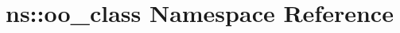 \hypertarget{namespacens_1_1oo__class}{}\section{ns\+::oo\+\_\+class Namespace Reference}
\label{namespacens_1_1oo__class}
